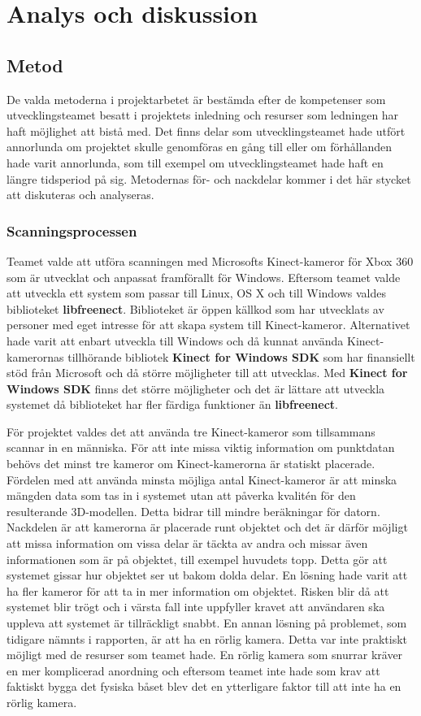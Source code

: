 \documentclass[a4paper,12pt,oneside,final]{extbook}
\begin{document}
\chapter{Analys och diskussion}
\section{Metod}
De valda metoderna i projektarbetet är bestämda efter de kompetenser som utvecklingsteamet besatt i projektets inledning och resurser som ledningen har haft möjlighet att bistå med. Det finns delar som utvecklingsteamet hade utfört annorlunda om projektet skulle genomföras en gång till eller om förhållanden hade varit annorlunda, som till exempel om utvecklingsteamet hade haft en längre tidsperiod på sig. Metodernas för- och nackdelar kommer i det här stycket att diskuteras och analyseras.

\subsection{Scanningsprocessen}

Teamet valde att utföra scanningen med Microsofts Kinect-kameror för Xbox 360 som är utvecklat och anpassat framförallt för Windows. Eftersom teamet valde att utveckla ett system som passar till Linux, OS X och till Windows valdes biblioteket \textbf{libfreenect}. Biblioteket är öppen källkod som har utvecklats av personer med eget intresse för att skapa system till Kinect-kameror. Alternativet hade varit att enbart utveckla till Windows och då kunnat använda Kinect-kamerornas tillhörande bibliotek \textbf{Kinect for Windows SDK} som har finansiellt stöd från Microsoft och då större möjligheter till att utvecklas. Med \textbf{Kinect for Windows SDK} finns det större möjligheter och det är lättare att utveckla systemet då biblioteket har fler färdiga funktioner än \textbf{libfreenect}.

För projektet valdes det att använda tre Kinect-kameror som tillsammans scannar in en människa. För att inte missa viktig information om punktdatan behövs det minst tre kameror om Kinect-kamerorna är statiskt placerade. Fördelen med att använda minsta möjliga antal Kinect-kameror är att minska mängden data som tas in i systemet utan att påverka kvalitén för den resulterande 3D-modellen. Detta bidrar till mindre beräkningar för datorn. Nackdelen är att kamerorna är placerade runt objektet och det är därför möjligt att missa information om vissa delar är täckta av andra och missar även informationen som är på objektet, till exempel huvudets topp. Detta gör att systemet gissar hur objektet ser ut bakom dolda delar. En lösning hade varit att ha fler kameror för att ta in mer information om objektet. Risken blir då att systemet blir trögt och i värsta fall inte uppfyller kravet att användaren ska uppleva att systemet är tillräckligt snabbt. En annan lösning på problemet, som tidigare nämnts i rapporten, är att ha en rörlig kamera. Detta var inte praktiskt möjligt med de resurser som teamet hade. En rörlig kamera som snurrar kräver en mer komplicerad anordning och eftersom teamet inte hade som krav att faktiskt bygga det fysiska båset blev det en ytterligare faktor till att inte ha en rörlig kamera.
\end{document}
